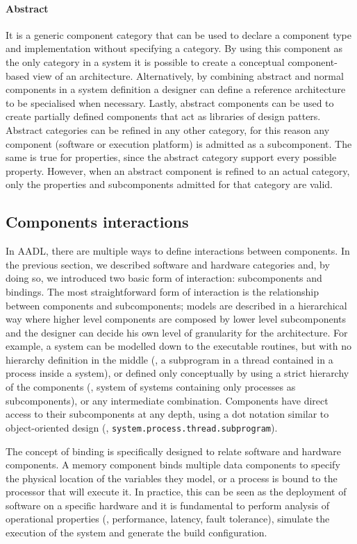 \paragraph{Abstract} It is a generic component category that can be used to declare a component type and implementation without specifying a category. By using this component as the only category in a system it is possible to create a conceptual component-based view of an architecture. Alternatively, by combining abstract and normal components in a system definition a designer can define a reference architecture to be specialised when necessary. Lastly, abstract components can be used to create partially defined components that act as libraries of design patters. Abstract categories can be refined in any other category, for this reason any component (software or execution platform) is admitted as a subcomponent. The same is true for properties, since the abstract category support every possible property. However, when an abstract component is refined to an actual category, only the properties and subcomponents admitted for that category are valid.

\subsection{Components interactions}
In AADL, there are multiple ways to define interactions between components. In the previous section, we described software and hardware categories and, by doing so, we introduced  two basic form of interaction: subcomponents and bindings. The most straightforward form of interaction is the relationship between components and subcomponents; models are described in a hierarchical way where higher level components are composed by lower level subcomponents and the designer can decide his own level of granularity for the architecture. For example, a system can be modelled down to the executable routines, but with no hierarchy definition in the middle (\ie, a subprogram in a thread contained in a process inside a system), or defined only conceptually by using a strict hierarchy of the components (\ie, system of systems containing only processes as subcomponents), or any intermediate combination. Components have direct access to their subcomponents at any depth, using a dot notation similar to object-oriented design (\eg, \texttt{system.process.thread.subprogram}).

The concept of binding is specifically designed to relate software and hardware components. A memory component binds multiple data components to specify the physical location of the variables they model, or a process is bound to the processor that will execute it. In practice, this can be seen as the deployment of software on a specific hardware and it is fundamental to perform analysis of operational properties (\eg, performance, latency, fault tolerance), simulate the execution of the system and generate the build configuration.

